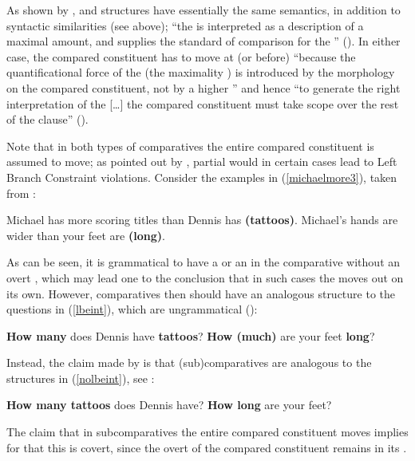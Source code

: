 As shown by \citet[571--574]{kennedy2002},  and  structures have essentially the same semantics, in addition to syntactic similarities (see above); ``the  is interpreted as a description of a maximal amount, and supplies the standard of comparison for the '' (\citealt[574]{kennedy2002}). In either case, the compared constituent has to move at  (or before) ``because the quantificational force of the  (the maximality ) is introduced by the  morphology on the compared constituent, not by a higher '' and hence ``to generate the right interpretation of the  [\ldots] the compared constituent must take scope over the rest of the clause'' (\citealt[574--575]{kennedy2002}).

Note that in both types of comparatives the entire compared constituent is assumed to move; as pointed out by \citet[581--582]{kennedy2002}, partial  would in certain cases lead to Left Branch Constraint violations. Consider the examples in (\ref{michaelmore3}), taken from \citet[581, ex. 79]{kennedy2002}:

\ea \label{michaelmore3}
\ea	Michael has more scoring titles than Dennis has \textbf{(tattoos)}.
\ex	Michael’s hands are wider than your feet are \textbf{(long)}.
\z
\z

As can be seen, it is grammatical to have a  or an  in the comparative  without an overt , which may lead one to the conclusion that in such cases the   moves out on its own. However, comparatives then should have an analogous structure to the questions in (\ref{lbeint}), which are ungrammatical (\citealt[581, ex. 80]{kennedy2002}):

\ea \label{lbeint}
\ea	*\textbf{How many} does Dennis have \textbf{tattoos}?
\ex	*\textbf{How (much)} are your feet \textbf{long}?
\z
\z
	
Instead, the claim made by \citet{kennedy2002} is that (sub)comparatives are analogous to the structures in (\ref{nolbeint}), see \citet[581, ex. 81]{kennedy2002}:

\ea \label{nolbeint}
\ea	\textbf{How many tattoos} does Dennis have?
\ex	\textbf{How long} are your feet?
\z
\z

The claim that in subcomparatives the entire compared constituent moves implies for \citet{kennedy2002} that this  is covert, since the overt  of the compared constituent remains in its .

